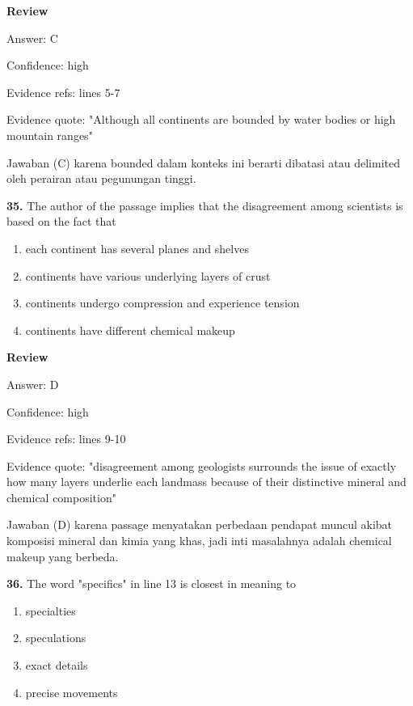 \documentclass[12pt]{article}
\begin{document}
\par
\begingroup
\setlength{\parskip}{0pt}
\setlength{\parindent}{0pt}
\textbf{Review}\par
Answer: C\par
Confidence: high\par
Evidence refs: lines 5-7\par
Evidence quote: "Although all continents are bounded by water bodies or high mountain ranges"\par
Jawaban (C) karena bounded dalam konteks ini berarti dibatasi atau delimited oleh perairan atau pegunungan tinggi.\par
\endgroup
\par
\vspace{0.25\baselineskip}
\noindent\textbf{35.} The author of the passage implies that the disagreement among scientists is based on the fact that
\begin{enumerate}[label=(\Alph*),leftmargin=*,itemsep=0.2em]
\item each continent has several planes and shelves
\item continents have various underlying layers of crust
\item continents undergo compression and experience tension
\item continents have different chemical makeup
\end{enumerate}
\par
\begingroup
\setlength{\parskip}{0pt}
\setlength{\parindent}{0pt}
\textbf{Review}\par
Answer: D\par
Confidence: high\par
Evidence refs: lines 9-10\par
Evidence quote: "disagreement among geologists surrounds the issue of exactly how many layers underlie each landmass because of their distinctive mineral and chemical composition"\par
Jawaban (D) karena passage menyatakan perbedaan pendapat muncul akibat komposisi mineral dan kimia yang khas, jadi inti masalahnya adalah chemical makeup yang berbeda.\par
\endgroup
\par
\vspace{0.25\baselineskip}
\noindent\textbf{36.} The word "specifics" in line 13 is closest in meaning to
\begin{enumerate}[label=(\Alph*),leftmargin=*,itemsep=0.2em]
\item specialties
\item speculations
\item exact details
\item precise movements
\end{enumerate}
\end{document}

